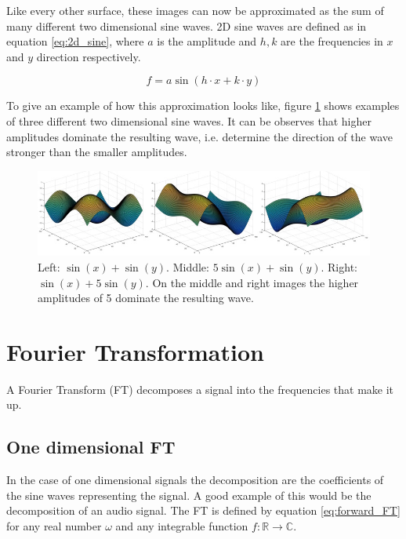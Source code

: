 Like every other surface, these images can now be approximated as the sum of many different two dimensional sine waves. 2D sine waves are defined as in equation \ref{eq:2d_sine}, where $a$ is the amplitude and $h, k$ are the frequencies in $x$ and $y$ direction respectively.

\begin{equation}
	f = a \sin(h\cdot x+k\cdot y)
	\label{eq:2d_sine}
\end{equation}

To give an example of how this approximation looks like, figure \ref{fig:2d_sine} shows examples of three different two dimensional sine waves. It can be observes that higher amplitudes dominate the resulting wave, i.e. determine the direction of the wave stronger than the smaller amplitudes. 


\begin{figure}[!htb]
	\centering
	\includegraphics[width = \textwidth]{images/2d_sine.jpg}
	\caption{Left: $\sin(x) +\sin(y)$. Middle:  $5 \sin(x)+ \sin(y)$. Right: $	\sin(x)+5\sin(y)$. On the middle and right images the higher amplitudes of 5 dominate the resulting wave. \protect\footnotemark}
	\label{fig:2d_sine}
\end{figure}


\section{Fourier Transformation}

A Fourier Transform (FT) decomposes a signal into the frequencies that make it up.
\subsection{One dimensional FT} 

In the case of one dimensional signals the decomposition are the coefficients of the sine waves representing the signal. A good example of this would be the decomposition of an audio signal. The FT is defined by equation \ref{eq:forward_FT} for any real number $\omega$ and any integrable function $f:\mathbb{R} \rightarrow \mathbb{C}$. 

